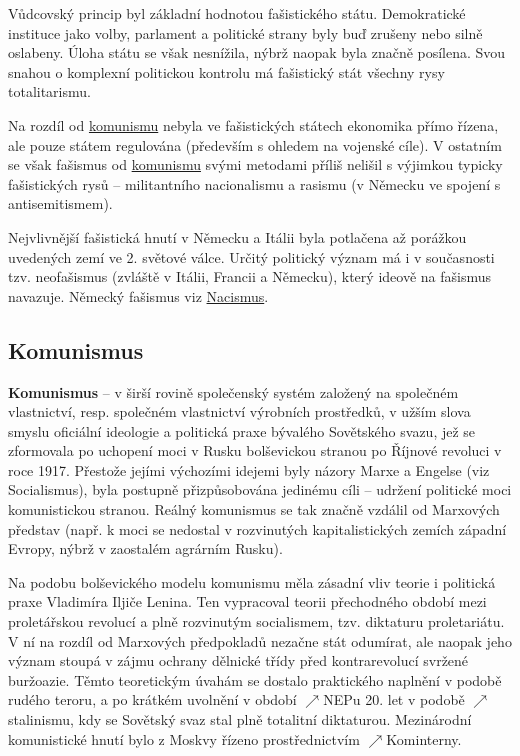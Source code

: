 \documentclass{article}
\begin{document}
  Vůdcovský princip byl základní hodnotou fašistického státu. Demokratické instituce jako volby, parlament a politické strany byly buď zrušeny nebo silně oslabeny. Úloha státu se však nesnížila, nýbrž naopak byla značně posílena. Svou snahou o komplexní politickou kontrolu má fašistický stát všechny rysy totalitarismu.

  Na rozdíl od \hyperref[sec:komunismus]{komunismu} nebyla ve fašistických státech ekonomika přímo řízena, ale pouze státem regulována (především s ohledem na vojenské cíle). V ostatním se však fašismus od \hyperref[sec:komunismus]{komunismu} svými metodami příliš nelišil s výjimkou typicky fašistických rysů -- militantního nacionalismu a rasismu (v Německu ve spojení s antisemitismem).

  Nejvlivnější fašistická hnutí v Německu a Itálii byla potlačena až porážkou uvedených zemí ve 2. světové válce. Určitý politický význam má i v současnosti tzv. neofašismus (zvláště v Itálii, Francii a Německu), který ideově na fašismus navazuje. Německý fašismus viz \hyperref[sec:nacismus]{Nacismus}.

  \subsection*{Komunismus~\cite{Pecenka:}}
  \label{sec:komunismus}

  {\bf Komunismus} -- v širší rovině společenský systém založený na společném vlastnictví, resp. společném vlastnictví výrobních prostředků, v užším slova smyslu oficiální ideologie a politická praxe bývalého Sovětského svazu, jež se zformovala po uchopení moci v Rusku bolševickou stranou po Říjnové revoluci v roce 1917. Přestože jejími výchozími idejemi byly názory Marxe a Engelse (viz Socialismus), byla postupně přizpůsobována jedinému cíli -- udržení politické moci komunistickou stranou. Reálný komunismus se tak značně vzdálil od Marxových představ (např. k moci se nedostal v rozvinutých kapitalistických zemích západní Evropy, nýbrž v zaostalém agrárním Rusku).

  Na podobu bolševického modelu komunismu měla zásadní vliv teorie i politická praxe Vladimíra Iljiče Lenina. Ten vypracoval teorii přechodného období mezi proletářskou revolucí a  plně rozvinutým socialismem, tzv. diktaturu proletariátu. V ní na rozdíl od Marxových předpokladů nezačne stát odumírat, ale naopak jeho význam stoupá v zájmu ochrany dělnické třídy před kontrarevolucí svržené buržoazie. Těmto teoretickým úvahám se dostalo praktického naplnění v podobě rudého teroru,  a po krátkém uvolnění v období $\nearrow$NEPu 20. let v podobě $\nearrow$stalinismu, kdy se Sovětský svaz stal plně totalitní diktaturou. Mezinárodní komunistické hnutí bylo z Moskvy řízeno prostřednictvím $\nearrow$Kominterny.
\end{document}
